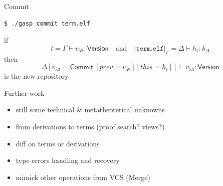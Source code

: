 \documentclass[ignorenonframetext,red]{beamer}
\newcommand\app[1]{{#1}\ }
\newcommand\eent[1]{\left[{#1}\right]}
\newcommand\econs[2]{{#1}\eent{#2}}
\newcommand\esing[1]{\econs{}{#1}}
\begin{document}
\begin{frame}[fragile]{Commit}
  \small
\begin{verbatim}
$ ./gasp commit term.elf
\end{verbatim}
\normalsize
if
\[ t = \Gamma\vdash v_{52} : \mathsf{Version} \quad\text{and}\quad
|\mathtt{term.elf}|_\Gamma = \Delta\vdash h_t:h_A \]
then 
\[ \econs\Delta{v_{53} = \app{\mathsf{Commit}} \econs{\esing{prev =
      v_{52}}}{this = h_t}}\vdash v_{53} : \mathsf{Version}\] is the
new repository
\end{frame}

\begin{frame}{Further work}
  \begin{itemize}
  \item still some technical \& metatheoretical unknowns
  \item from derivations to terms (proof search? views?)
  \item \textsf{diff} on terms or derivations
  \item type errors handling and recovery
  \item mimick other operations from VCS (\textsf{Merge})
  \end{itemize}
\end{frame}
\end{document}
